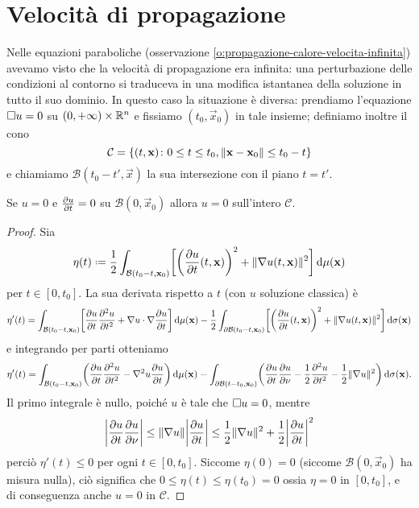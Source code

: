 \section{Velocità di propagazione}
Nelle equazioni paraboliche (osservazione \ref{o:propagazione-calore-velocita-infinita}) avevamo visto che la velocità di propagazione era infinita: una perturbazione delle condizioni al contorno si traduceva in una modifica istantanea della soluzione in tutto il suo dominio.
In questo caso la situazione è diversa: prendiamo l'equazione $\dal u=0$ su $(0,+\infty)\times\R^n$ e fissiamo $(t_0,\vec x_0)$ in tale insieme; definiamo inoltre il cono
\begin{equation}
    \mathcal{C}=\{(t,\vec x)\colon 0\le t\le t_0, \norm{\vec x-\vec x_0}\le t_0-t\}
\end{equation}
e chiamiamo $\mathcal{B}(t_0-t',\vec x)$ la sua intersezione con il piano $t=t'$.
\begin{teorema}
    Se $u=0$ e $\drp{u}{t}=0$ su $\mathcal{B}(0,\vec x_0)$ allora $u=0$ sull'intero $\mathcal{C}$.
\end{teorema}
\begin{proof}
    Sia
    \begin{equation}
        \eta(t)\defeq\frac12\int_{\mathcal{B}(t_0-t,\vec x_0)}\biggl[\biggl(\drp{u}{t}(t,\vec x)\biggr)^2+\norm{\grad u(t,\vec x)}^2\biggr]\,\dd\mu(\vec x)
    \end{equation}
    per $t\in[0,t_0]$.
    La sua derivata rispetto a $t$ (con $u$ soluzione classica) è
    \begin{equation}
        \eta'(t)=
        \int_{\mathcal{B}(t_0-t,\vec x_0)}\biggl[\drp{u}{t}\ddrp{u}{t}+\scalar{\grad u}{\grad\drp{u}{t}}\biggr]\,\dd\mu(\vec x)-
        \frac12\int_{\boundary\mathcal{B}(t_0-t,\vec x_0)}\biggl[\biggl(\drp{u}{t}(t,\vec x)\biggr)^2+\norm{\grad u(t,\vec x)}^2\biggr]\,\dd\sigma(\vec x)
    \end{equation}
    e integrando per parti otteniamo
    \begin{equation}
        \eta'(t)=
        \int_{\mathcal{B}(t_0-t,\vec x_0)}\biggl(\drp{u}{t}\ddrp{u}{t}-\lap u\drp{u}{t}\biggr)\,\dd\mu(\vec x)-
        \int_{\boundary\mathcal{B}(t-t_0,\vec x_0)}\biggl(\drp{u}{t}\drp{u}{\nu}-\frac12\ddrp{u}{t}-\frac12\norm{\grad u}^2\biggr)\,\dd\sigma(\vec x).
    \end{equation}
    Il primo integrale è nullo, poich\'e $u$ è tale che $\dal u=0$, mentre
    \begin{equation}
        \abs[\bigg]{\drp{u}{t}\drp{u}{\nu}}\le
        \norm{\grad u}\abs[\bigg]{\drp{u}{t}}\le
        \frac12\norm{\grad u}^2+\frac12\abs[\bigg]{\drp{u}{t}}^2
    \end{equation}
    perciò $\eta'(t)\le 0$ per ogni $t\in[0,t_0]$.
    Siccome $\eta(0)=0$ (siccome $\mathcal{B}(0,\vec x_0)$ ha misura nulla), ciò significa che $0\le\eta(t)\le\eta(t_0)=0$ ossia $\eta=0$ in $[0,t_0]$, e di conseguenza anche $u=0$ in $\mathcal{C}$.
\end{proof}

